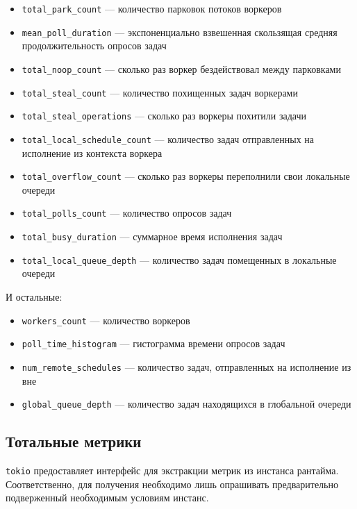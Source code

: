 \begin{itemize}
    \item \verb|total_park_count| --- количество парковок потоков воркеров
    \item \verb|mean_poll_duration| --- экспоненциально взвешенная скользящая средняя продолжительность опросов задач
    \item \verb|total_noop_count| --- сколько раз воркер бездействовал между парковками
    \item \verb|total_steal_count| --- количество похищенных задач воркерами
    \item \verb|total_steal_operations| --- сколько раз воркеры похитили задачи
    \item \verb|total_local_schedule_count| --- количество задач отправленных на исполнение из контекста воркера
    \item \verb|total_overflow_count| --- сколько раз воркеры переполнили свои локальные очереди
    \item \verb|total_polls_count| --- количество опросов задач
    \item \verb|total_busy_duration| --- суммарное время исполнения задач
    \item \verb|total_local_queue_depth| --- количество задач помещенных в локальные очереди
\end{itemize}

И остальные:

\begin{itemize}
    \item \verb|workers_count| --- количество воркеров

    \item \verb|poll_time_histogram| --- гистограмма времени опросов задач

    \item \verb|num_remote_schedules| --- количество задач, отправленных на исполнение из вне

    \item \verb|global_queue_depth| --- количество задач находящихся в глобальной очереди
\end{itemize}

\subsection{Тотальные метрики}

\verb|tokio| предоставляет интерфейс для экстракции метрик из инстанса рантайма. Соответственно, для получения необходимо лишь опрашивать предварительно подверженный необходимым условиям инстанс.


